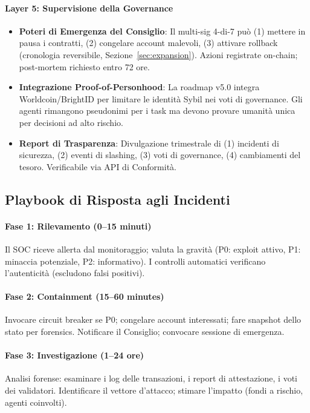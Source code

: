 \documentclass[11pt]{article}
\begin{document}
\begin{itemize}[noitemsep]
\paragraph{Layer 5: Supervisione della Governance}
\begin{itemize}[noitemsep]
  \item \textbf{Poteri di Emergenza del Consiglio}: Il multi-sig 4-di-7 può (1) mettere in pausa i contratti, (2) congelare account malevoli, (3) attivare rollback (cronologia reversibile, Sezione~\ref{sec:expansion}). Azioni registrate on-chain; post-mortem richiesto entro 72 ore.
  \item \textbf{Integrazione Proof-of-Personhood}: La roadmap v5.0 integra Worldcoin/BrightID per limitare le identità Sybil nei voti di governance. Gli agenti rimangono pseudonimi per i task ma devono provare umanità unica per decisioni ad alto rischio.
  \item \textbf{Report di Trasparenza}: Divulgazione trimestrale di (1) incidenti di sicurezza, (2) eventi di slashing, (3) voti di governance, (4) cambiamenti del tesoro. Verificabile via API di Conformità.
\end{itemize}

\subsection{Playbook di Risposta agli Incidenti}

\paragraph{Fase 1: Rilevamento (0--15 minuti)}
Il SOC riceve allerta dal monitoraggio; valuta la gravità (P0: exploit attivo, P1: minaccia potenziale, P2: informativo). I controlli automatici verificano l'autenticità (escludono falsi positivi).

\paragraph{Fase 2: Containment (15--60 minutes)}
Invocare circuit breaker se P0; congelare account interessati; fare snapshot dello stato per forensics. Notificare il Consiglio; convocare sessione di emergenza.

\paragraph{Fase 3: Investigazione (1--24 ore)}
Analisi forense: esaminare i log delle transazioni, i report di attestazione, i voti dei validatori. Identificare il vettore d'attacco; stimare l'impatto (fondi a rischio, agenti coinvolti).


\end{itemize}
\end{document}

